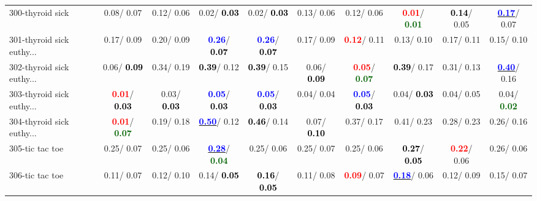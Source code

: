 \begin{table}[h]
\begin{center}
{\begin{tabular}{lc|c|c|c|c|c|c|c|c}
300-thyroid sick &   0.08/  0.07 &   0.12/  0.06 &   0.02/\textcolor{black}{\textbf{  0.03}} &   0.02/\textcolor{black}{\textbf{  0.03}} &   0.13/  0.06 &   0.12/  0.06 & \textcolor{red}{\textbf{  0.01}}/\textcolor{darkgreen}{\textbf{  0.01}} & \textcolor{black}{\textbf{  0.14}}/  0.05 & \underline{\textcolor{blue}{\textbf{  0.17}}}/  0.07 \\
301-thyroid sick euthy... &   0.17/  0.09 &   0.20/  0.09 & \textcolor{blue}{\textbf{  0.26}}/\textcolor{black}{\textbf{  0.07}} & \textcolor{blue}{\textbf{  0.26}}/\textcolor{black}{\textbf{  0.07}} &   0.17/  0.09 & \textcolor{red}{\textbf{  0.12}}/  0.11 &   0.13/  0.10 &   0.17/  0.11 &   0.15/  0.10 \\
302-thyroid sick euthy... &   0.06/\textcolor{black}{\textbf{  0.09}} &   0.34/  0.19 & \textcolor{black}{\textbf{  0.39}}/  0.12 & \textcolor{black}{\textbf{  0.39}}/  0.15 &   0.06/\textcolor{black}{\textbf{  0.09}} & \textcolor{red}{\textbf{  0.05}}/\textcolor{darkgreen}{\textbf{  0.07}} & \textcolor{black}{\textbf{  0.39}}/  0.17 &   0.31/  0.13 & \underline{\textcolor{blue}{\textbf{  0.40}}}/  0.16 \\ \hline
303-thyroid sick euthy... & \textcolor{red}{\textbf{  0.01}}/\textcolor{black}{\textbf{  0.03}} &   0.03/\textcolor{black}{\textbf{  0.03}} & \textcolor{blue}{\textbf{  0.05}}/\textcolor{black}{\textbf{  0.03}} & \textcolor{blue}{\textbf{  0.05}}/\textcolor{black}{\textbf{  0.03}} &   0.04/  0.04 & \textcolor{blue}{\textbf{  0.05}}/\textcolor{black}{\textbf{  0.03}} &   0.04/\textcolor{black}{\textbf{  0.03}} &   0.04/  0.05 &   0.04/\textcolor{darkgreen}{\textbf{  0.02}} \\
304-thyroid sick euthy... & \textcolor{red}{\textbf{  0.01}}/\textcolor{darkgreen}{\textbf{  0.07}} &   0.19/  0.18 & \underline{\textcolor{blue}{\textbf{  0.50}}}/  0.12 & \textcolor{black}{\textbf{  0.46}}/  0.14 &   0.07/\textcolor{black}{\textbf{  0.10}} &   0.37/  0.17 &   0.41/  0.23 &   0.28/  0.23 &   0.26/  0.16 \\
305-tic tac toe &   0.25/  0.07 &   0.25/  0.06 & \underline{\textcolor{blue}{\textbf{  0.28}}}/\textcolor{darkgreen}{\textbf{  0.04}} &   0.25/  0.06 &   0.25/  0.07 &   0.25/  0.06 & \textcolor{black}{\textbf{  0.27}}/\textcolor{black}{\textbf{  0.05}} & \textcolor{red}{\textbf{  0.22}}/  0.06 &   0.26/  0.06 \\
306-tic tac toe &   0.11/  0.07 &   0.12/  0.10 &   0.14/\textcolor{black}{\textbf{  0.05}} & \textcolor{black}{\textbf{  0.16}}/\textcolor{black}{\textbf{  0.05}} &   0.11/  0.08 & \textcolor{red}{\textbf{  0.09}}/  0.07 & \underline{\textcolor{blue}{\textbf{  0.18}}}/  0.06 &   0.12/  0.09 &   0.15/  0.07 \\

\end{tabular}}
\end{center}
\end{table}
